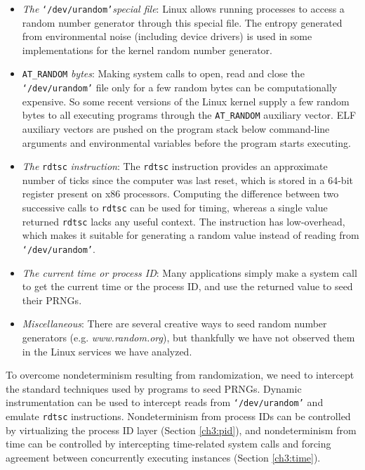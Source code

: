 \begin{itemize}

\item {\em The} \texttt{`/dev/urandom'}{\em special file}: Linux allows
running processes to access a random number generator through this special file. The entropy generated
from environmental noise (including device drivers)
is used in some implementations for the kernel random number generator.
\item \texttt{AT\_RANDOM} {\em bytes}: 
Making system calls to open, read and close the
\texttt{`/dev/urandom'} file only for a
few random bytes can be computationally expensive. So 
some recent versions of the Linux kernel supply
a few random bytes to all executing programs
through the \texttt{AT\_RANDOM} auxiliary vector.
ELF auxiliary vectors are pushed on the program
stack below command-line arguments and environmental
variables before the program starts executing.

\item {\em The} \texttt{rdtsc} {\em instruction}:
The \texttt{rdtsc} instruction provides an approximate number of ticks since
the computer was last reset, which is stored in a 64-bit register present
on x86 processors. Computing the difference between two successive
calls to \texttt{rdtsc} can be used for timing, whereas a single
value returned \texttt{rdtsc} lacks any useful context.  
The instruction has low-overhead, which makes it suitable for generating a random value
instead of reading from \texttt{`/dev/urandom'}. 

\item {\em The current time or process ID}: Many applications simply make a system call
to get the current time or the process ID, and use the returned value to seed their PRNGs. 

\item {\em Miscellaneous}: There
are several creative ways to seed random number
generators (e.g. {\em www.random.org}),
but thankfully we have not observed them
in the Linux services we have analyzed.
      
\end{itemize}

To overcome nondeterminism resulting from randomization, 
we need to intercept the standard techniques
used by programs to seed PRNGs.
Dynamic instrumentation can be used to 
intercept reads from \texttt{`/dev/urandom'}
and emulate \texttt{rdtsc} instructions.
Nondeterminism from process IDs
can be controlled by virtualizing the process ID
layer (Section \ref{ch3:pid}), and nondeterminism
from time can be controlled by intercepting
time-related system calls and forcing
agreement between concurrently executing 
instances (Section \ref{ch3:time}).

